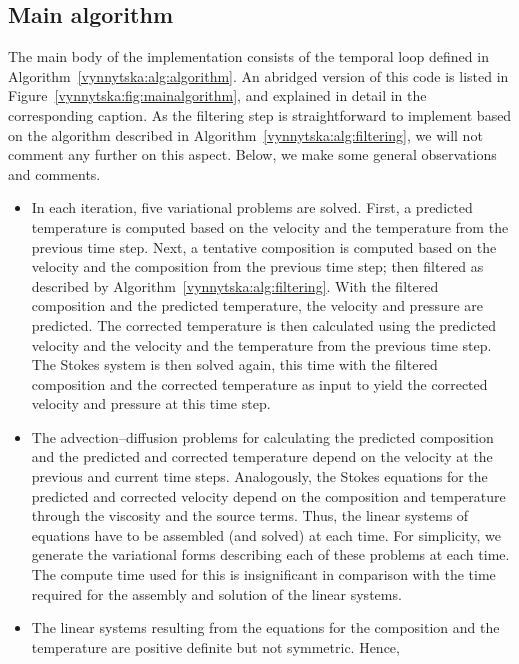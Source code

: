 \subsection{Main algorithm}

The\enlargethispage{12pt} main body of the implementation consists of the temporal loop
defined in Algorithm~\ref{vynnytska:alg:algorithm}. An abridged version
of this code is listed in Figure~\ref{vynnytska:fig:mainalgorithm},
and explained in detail in the corresponding caption.  As the filtering
step is straightforward to implement based on the algorithm described in
Algorithm~\ref{vynnytska:alg:filtering}, we will not comment any further
on this aspect. Below, we make some general observations and comments.
\begin{itemize}
\item
  In each iteration, five variational problems are solved. First, a
  predicted temperature is computed based on the velocity and the
  temperature from the previous time step. Next, a tentative
  composition is computed based on the velocity and the composition
  from the previous time step; then filtered as described by
  Algorithm~\ref{vynnytska:alg:filtering}. With the filtered
  composition and the predicted temperature, the velocity and pressure
  are predicted.  The corrected temperature is then calculated using the predicted velocity and the
  velocity and the temperature from the previous time step. The Stokes
  system is then solved again, this time with the filtered composition
  and the corrected temperature as input to yield the corrected
  velocity and pressure at this time step.
\item
  The advection--diffusion problems for calculating the predicted
  composition and the predicted and corrected temperature depend on
  the velocity at the previous and current time steps. Analogously,
  the Stokes equations for the predicted and corrected velocity depend
  on the composition and temperature through the viscosity and the
  source terms. Thus, the linear systems of equations have to be
  assembled (and solved) at each time. For simplicity, we generate the
  variational forms describing each of these problems at each
  time. The compute time used for this is insignificant in comparison
  with the time required for the assembly and solution of the linear
  systems.
\item
  The linear systems resulting from the equations for the composition
  and the temperature are positive definite but not symmetric. Hence,

\end{itemize}
